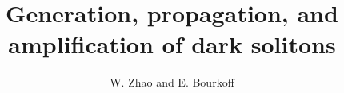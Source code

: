 %
%
%
\newcommand{\MF}{{\large{\manual META}\-{\manual FONT}}}
\newcommand{\manual}{rm}        %
\newcommand\bs{\char '134 }     %
%
%
%
%
%
\title{Generation, propagation, and amplification of dark solitons}
%
\author{W. Zhao and E. Bourkoff}
%
\address{Department of Electrical and Computer Engineering,
The University of South Carolina,
Columbia, South Carolina, 29208}
%
\maketitle
